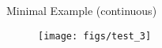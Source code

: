 \begin{frame}{Minimal Example (continuous)}

  \begin{figure}[h]
    \texttt{[image: figs/test\_3]}
  \end{figure}  

\end{frame}

